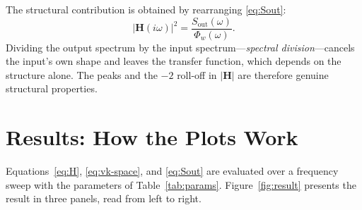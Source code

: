 \documentclass[11pt]{article}
\begin{document}
The structural contribution is obtained by rearranging \eqref{eq:Sout}:
\begin{equation}
\big|\mathbf H(i\omega)\big|^2 = \frac{S_{\mathrm{out}}(\omega)}{\Phi_w(\omega)} .
\label{eq:divide}
\end{equation}
Dividing the output spectrum by the input spectrum---\emph{spectral
division}---cancels the input's own shape and leaves the transfer function,
which depends on the structure alone. The peaks and the $-2$ roll-off in
$|\mathbf H|$ are therefore genuine structural properties.

\section{Results: How the Plots Work}
Equations~\eqref{eq:H}, \eqref{eq:vk-space}, and \eqref{eq:Sout} are evaluated over a
frequency sweep with the parameters of
Table~\ref{tab:params}. Figure~\ref{fig:result} presents the result in three panels, read from left to right.
\end{document}
